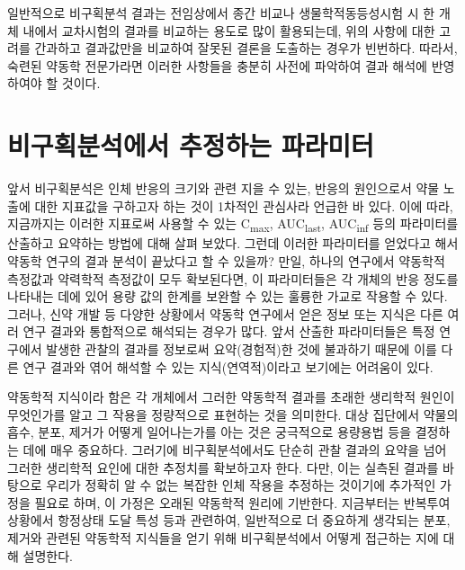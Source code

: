\documentclass[
  11pt,
  krantz2, a4paper, twoside]{krantz}
\theoremstyle{definition}
\theoremstyle{definition}
\theoremstyle{definition}
\theoremstyle{definition}
\theoremstyle{remark}
\begin{document}
일반적으로 비구획분석 결과는 전임상에서 종간 비교나 생물학적동등성시험 시 한 개체 내에서 교차시험의 결과를 비교하는 용도로 많이 활용되는데, 위의 사항에 대한 고려를 간과하고 결과값만을 비교하여 잘못된 결론을 도출하는 경우가 빈번하다. 따라서, 숙련된 약동학 전문가라면 이러한 사항들을 충분히 사전에 파악하여 결과 해석에 반영하여야 할 것이다.

\section{비구획분석에서 추정하는 파라미터}\label{uxbe44uxad6cuxd68duxbd84uxc11duxc5d0uxc11c-uxcd94uxc815uxd558uxb294-uxd30cuxb77cuxbbf8uxd130}

앞서 비구획분석은 인체 반응의 크기와 관련 지을 수 있는, 반응의 원인으로서 약물 노출에 대한 지표값을 구하고자 하는 것이 1차적인 관심사라 언급한 바 있다.
이에 따라, 지금까지는 이러한 지표로써 사용할 수 있는 C\textsubscript{max}, AUC\textsubscript{last}, AUC\textsubscript{inf} 등의 파라미터를 산출하고 요약하는 방법에 대해 살펴 보았다.
그런데 이러한 파라미터를 얻었다고 해서 약동학 연구의 결과 분석이 끝났다고 할 수 있을까?
만일, 하나의 연구에서 약동학적 측정값과 약력학적 측정값이 모두 확보된다면, 이 파라미터들은 각 개체의 반응 정도를 나타내는 데에 있어 용량 값의 한계를 보완할 수 있는 훌륭한 가교로 작용할 수 있다.
그러나, 신약 개발 등 다양한 상황에서 약동학 연구에서 얻은 정보 또는 지식은 다른 여러 연구 결과와 통합적으로 해석되는 경우가 많다.
앞서 산출한 파라미터들은 특정 연구에서 발생한 관찰의 결과를 정보로써 요약(경험적)한 것에 불과하기 때문에 이를 다른 연구 결과와 엮어 해석할 수 있는 지식(연역적)이라고 보기에는 어려움이 있다.

약동학적 지식이라 함은 각 개체에서 그러한 약동학적 결과를 초래한 생리학적 원인이 무엇인가를 알고 그 작용을 정량적으로 표현하는 것을 의미한다. 대상 집단에서 약물의 흡수, 분포, 제거가 어떻게 일어나는가를 아는 것은 궁극적으로 용량용법 등을 결정하는 데에 매우 중요하다. 그러기에 비구획분석에서도 단순히 관찰 결과의 요약을 넘어 그러한 생리학적 요인에 대한 추정치를 확보하고자 한다. 다만, 이는 실측된 결과를 바탕으로 우리가 정확히 알 수 없는 복잡한 인체 작용을 추정하는 것이기에 추가적인 가정을 필요로 하며, 이 가정은 오래된 약동학적 원리에 기반한다. 지금부터는 반복투여 상황에서 항정상태 도달 특성 등과 관련하여, 일반적으로 더 중요하게 생각되는 분포, 제거와 관련된 약동학적 지식들을 얻기 위해 비구획분석에서 어떻게 접근하는 지에 대해 설명한다.
\end{document}
